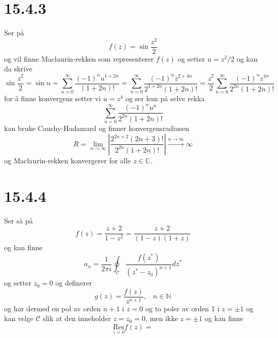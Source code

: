 \documentclass{report}
\newcommand{\M}[2]{\mathbb{#1}^{#2}}
\newcommand{\linebrack}[1]{\left| #1 \right|}
\newcommand{\limtoinf}[1]{\lim_{#1 \rightarrow \infty}}
\newcommand{\Res}[1]{\underset{#1}{\text{Res}}}
\begin{document}
\section*{15.4.3}
Ser på
\begin{equation}
  \label{eq:10}
  f(z) = \sin \frac{z^{2}}{2}
\end{equation}
og vil finne Maclaurin-rekken som representerer $f(z)$ og setter $u = z^{2}/2$ og kan da skrive
\begin{equation}
  \label{eq:14}
  \sin \frac{z^{2}}{2} = \sin u = \sum_{n=0}^{\infty} \frac{(-1)^{n} u^{1+2n}}{(1+2n)!} = \sum_{n=0}^{\infty} \frac{(-1)^{n} z^{2+4n}}{2^{1+2n}(1+2n)!} = \frac{z^{2}}{2} \sum_{n=0}^{\infty} \frac{(-1)^{n} z^{4n}}{2^{2n}(1+2n)!}
\end{equation}
for å finne konvergens setter vi $u = z^{4}$ og ser kun på selve rekka
\begin{equation}
  \label{eq:16}
  \sum_{n=0}^{\infty} \frac{(-1)^{n}u^{n}}{2^{2n}(1+2n)!}
\end{equation}
kan bruke Cauchy-Hadamard og finner konvergensradiusen
\begin{equation}
  \label{eq:17}
  R = \limtoinf{n} \linebrack{ \frac{ 2^{2n + 2} (2n + 3)! }{ 2^{2n}(1+2n)! } } \xrightarrow{n \to \infty} \infty
\end{equation}
og Maclaurin-rekken konvergerer for alle $z\in \M{C}{}$.


\section*{15.4.4}
Ser så på
\begin{equation}
  \label{eq:18}
  f(z) = \frac{z+2}{1-z^{2}} = \frac{z+2}{(1-z)(1+z)}
\end{equation}
og kan finne
\begin{equation}
  \label{eq:19}
  a_{n} = \frac{1}{2\pi i} \oint_{\mathcal{C}} \frac{f(z^{*})}{(z^{*} - z_{0})^{n+1}}dz^{*}
\end{equation}
og setter $z_{0} = 0$ og definerer
\begin{equation}
  \label{eq:20}
  g(z) = \frac{f(z)}{z^{n+1}}, \;\;\; n \in \M{N}{}
\end{equation}
og har dermed en pol av orden $n+1$ i $z = 0$ og to poler av orden 1 i $z=\pm 1$ og kan velge $\mathcal{C}$ slik at den inneholder $z = z_{0} = 0$, men ikke $z = \pm 1$ og kan finne
\begin{equation}
  \label{eq:21}
  \Res{z=0} f(z) =
\end{equation}
\end{document}

